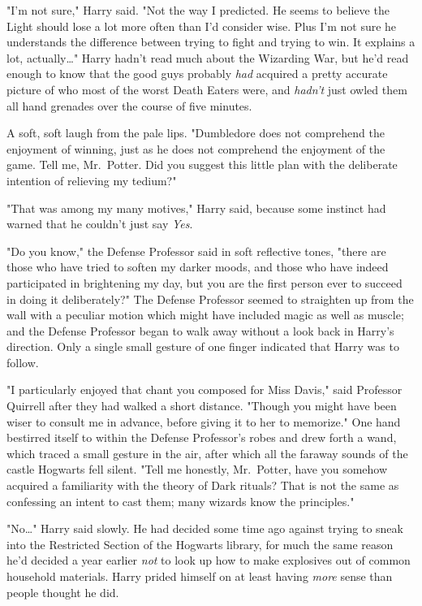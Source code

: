"I'm not sure," Harry said. "Not the way I predicted. He seems to believe the
Light should lose a lot more often than I'd consider wise. Plus I'm not sure he
understands the difference between trying to fight and trying to win. It
explains a lot, actually{\ldots}" Harry hadn't read much about the Wizarding
War, but he'd read enough to know that the good guys probably \emph{had}
acquired a pretty accurate picture of who most of the worst Death Eaters were,
and \emph{hadn't} just owled them all hand grenades over the course of five
minutes.

A soft, soft laugh from the pale lips. "Dumbledore does not comprehend the
enjoyment of winning, just as he does not comprehend the enjoyment of the game.
Tell me, Mr.~Potter. Did you suggest this little plan with the deliberate
intention of relieving my tedium?"

"That was among my many motives," Harry said, because some instinct had warned
that he couldn't just say \emph{Yes}.

"Do you know," the Defense Professor said in soft reflective tones, "there are
those who have tried to soften my darker moods, and those who have indeed
participated in brightening my day, but you are the first person ever to
succeed in doing it deliberately?" The Defense Professor seemed to straighten
up from the wall with a peculiar motion which might have included magic as well
as muscle; and the Defense Professor began to walk away without a look back in
Harry's direction. Only a single small gesture of one finger indicated that
Harry was to follow.

"I particularly enjoyed that chant you composed for Miss Davis," said Professor
Quirrell after they had walked a short distance. "Though you might have been
wiser to consult me in advance, before giving it to her to memorize." One hand
bestirred itself to within the Defense Professor's robes and drew forth a wand,
which traced a small gesture in the air, after which all the faraway sounds of
the castle Hogwarts fell silent. "Tell me honestly, Mr.~Potter, have you
somehow acquired a familiarity with the theory of Dark rituals? That is not the
same as confessing an intent to cast them; many wizards know the principles."

"No{\ldots}" Harry said slowly. He had decided some time ago against trying to
sneak into the Restricted Section of the Hogwarts library, for much the same
reason he'd decided a year earlier \emph{not} to look up how to make explosives
out of common household materials. Harry prided himself on at least having
\emph{more} sense than people thought he did.

